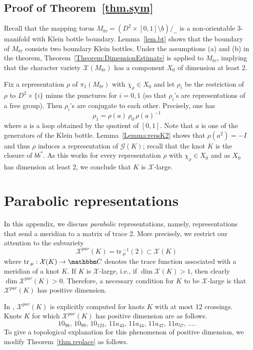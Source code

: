 \documentclass[12pt,reqno]{amsart}
\theoremstyle{definition}
\def\BC{\mathbbm C}
\def\calG{\mathcal G}
\def\calX{\mathcal X}
\def\tr{\mathrm{tr}\,}
\begin{document}
\subsection{Proof of Theorem~\ref{thm.sym}}

Recall that the mapping torus  $M_{b \tau} = (D^2 \times [0,1] \setminus b)/_\sim$ is a non-orientable 3-manifold with Klein bottle boundary.
Lemma~\ref{lem.bt} shows that the boundary of $M_{b \tau}$ consists two boundary Klein bottles. Under the assumptions (a) and (b) in the theorem, Theorem~\ref{Theorem:DimensionEstimate} is applied to $M_{b \tau}$, implying that the character variety $\calX(M_{b\tau})$ has a component $X_0$ of dimension at least 2.

Fix a representation $\rho$ of $\pi_1(M_{b\tau})$ with $\chi_\rho \in X_0$ and let $\rho_i$ be the restriction of $\rho$ to $D^2 \times \{i\}$ minus the punctures for $i=0,1$ (so that $\rho_i$'s are representations of a free group). Then $\rho_i$'s are conjugate to each other. Precisely, one has  $$\rho_1 = \rho(a) \,\rho_0 \,\rho(a)^{-1}$$ 
where $a$ is a loop obtained by the quotient of $[0,1]$.
Note that $a$ is one of the generators of the Klein bottle. Lemma~\ref{Lemma:repsK2} shows that $\rho(a^2) = -I$ and thus  $\rho$ induces a representation of $\calG(K)$; recall that the knot $K$ is the closure of $bb^\ast$. As this works for every representation  $\rho$ with $\chi_\rho \in X_0$ and as $X_0$ has dimension at least 2, we conclude that $K$ is $\calX$-large.


\appendix

\section{Parabolic representations}
\label{sec.app}

In this appendix, we discuss \emph{parabolic} representations, namely, representations that send a meridian to a matrix of trace 2. More precisely, we restrict our attention to the subvariety
$$
\calX^{par}(K) = \tr_\mu^{-1}(2) \subset \calX(K)
$$
where $\tr_\mu : \calX(K) \rightarrow \BC$ denotes the trace function associated with a meridian of a knot $K$. If $K$ is $\calX$-large, i.e., if $\dim \calX(K) >1$, then clearly $\dim \calX^{par}(K) >0$. Therefore, a necessary condition for $K$ to be $\calX$-large is that $\calX^{par}(K)$ has positive dimension. 

In \cite{diagramsite}, $\calX^{par}(K)$ is explicitly computed for knots $K$ with at most 12 crossings. Knots $K$ for which $\calX^{par}(K)$ has positive dimension are as follows.
$$
10_{98}, \, 10_{99},\,  10_{123}, \, 11a_{43}, \, 11a_{44}, \, 11a_{47}, \, 11a_{57},\,  \ldots.
$$
To give a topological explanation for this phenomenon of positive dimension,  we modify Theorem~\ref{thm.replace} as follows.
\end{document}
